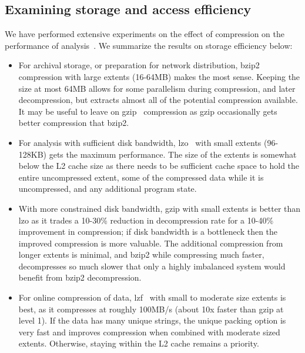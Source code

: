 \documentclass{acm_proc_article-sp}
\begin{document}
\subsection{Examining storage and access efficiency}\label{sec:efficiency}

We have performed extensive experiments on the effect of compression
on the performance of analysis~\cite{DSTechnicalReportSnapshot}.  We
summarize the results on storage efficiency below:

\begin{itemize}

\item For archival storage, or preparation for network distribution,
bzip2~\cite{BZIP} compression with large extents (16-64MB) makes the
most sense.  Keeping the size at most 64MB allows for some parallelism
during compression, and later decompression, but extracts almost all
of the potential compression available.  It may be useful to leave on
gzip~\cite{GZIP} compression 
as gzip occasionally gets better compression that
bzip2.

\item For analysis with sufficient disk bandwidth, lzo~\cite{LZO} with
small extents (96-128KB) gets the maximum performance.  The size of
the extents is somewhat below the L2 cache size as there needs to be
sufficient cache space to hold the entire uncompressed extent, some of
the compressed data while it is uncompressed, and any additional
program state.

\item With more constrained disk bandwidth, gzip
with
small extents is better than lzo as it trades a 10-30\% reduction in
decompression rate for a 10-40\% improvement in compression; if disk
bandwidth is a 
bottleneck then the improved compression is more valuable.
The additional compression from longer extents is minimal, and bzip2
while compressing much faster, decompresses so much slower that only a
highly imbalanced system would benefit from bzip2 decompression.

\item For online compression of data, lzf~\cite{LZF} with small to
moderate size extents is 
best, as it compresses at roughly 100MB/s (about 10x
faster than gzip at level 1).
If the data has many unique strings, the unique packing option
is very fast and improves compression when combined with moderate
sized extents.
Otherwise, staying within the L2 cache remains a priority.
\end{itemize}
\end{document}
